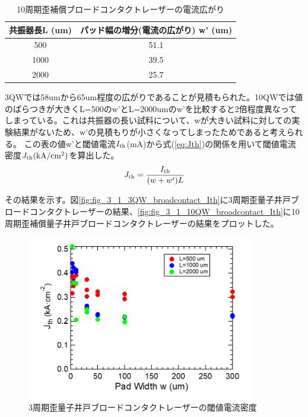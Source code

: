 \begin{table}[h]
  \caption{10周期歪補償ブロードコンタクトレーザーの電流広がり}
  \label{table:table_10QW_broadcontact_w_eff}
  \centering
  \begin{tabular}{cc}
    \hline
    共振器長L (um)  & パッド幅の増分(電流の広がり) w' (um)   \\
    \hline \hline
     500 & 51.1  \\
    1000  & 39.5 \\
    2000  & 25.7 \\ 
    \hline
  \end{tabular}
\end{table}

3QWでは58umから65um程度の広がりであることが見積もられた。10QWでは値のばらつきが大きくL=500のw'とL=2000umのw'を比較すると2倍程度異なってしまっている。これは共振器の長い試料について、wが大きい試料に対しての実験結果がないため、w'の見積もりが小さくなってしまったためであると考えられる。
この表の値w'と閾値電流$I_{\rm{th}}$(mA)から式(\ref{eq:Jth})の関係を用いて閾値電流密度$J_{\rm{th}} \rm{(kA/cm^2)}$を算出した。
\begin{eqnarray}
J_{\rm{th}}=\dfrac{I_{\rm{th}}}{(w+w')L}
\label{eq:Jth}
\end{eqnarray}

その結果を示す。図\ref{fig:fig_3_1_3QW_broadcontact_Ith}に3周期歪量子井戸ブロードコンタクトレーザーの結果、\ref{fig:fig_3_1_10QW_broadcontact_Ith}に10周期歪補償量子井戸ブロードコンタクトレーザーの結果をプロットした。

\begin{figure}[h]
	\centering
	\includegraphics[width=10cm]{figure/fig_3_1_3QW_broadcontact_Jth.png}
		\caption{3周期歪量子井戸ブロードコンタクトレーザーの閾値電流密度}
		\label{fig:fig_3_1_3QW_broadcontact_Jth}
\end{figure}

